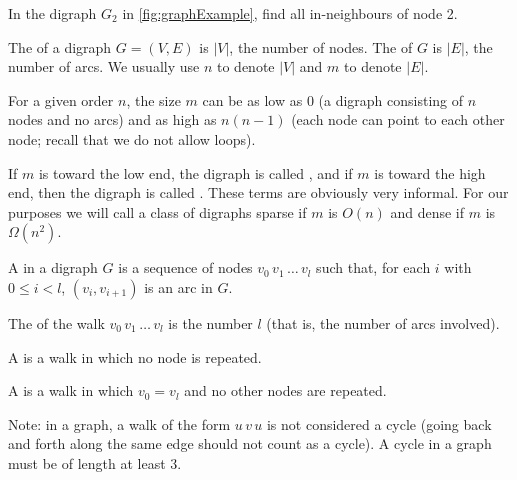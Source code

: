 \begin{Boxample}[2]
In the digraph $G_2$ in \cref{fig:graphExample}, find all in-neighbours of node 2.
\end{Boxample}


%


\begin{Definition} 
The  of a digraph $G=(V,E)$ is $|V|$, the number of nodes. 
The  of $G$ is $|E|$, the number of arcs. We usually use $n$ to denote $|V|$ and $m$ to denote
$|E|$.

\end{Definition}
 

For a given order $n$, the size $m$ can be as low as $0$ (a digraph
consisting of $n$ nodes and no arcs)  and as high as
$n(n-1)$ (each node can point to each other node; recall that we do
not allow loops).

\begin{Definition}  If $m$ is toward the low end, the digraph is called
, and if $m$ is toward the high end, then the digraph
is called . These terms are obviously very informal. For
our purposes we will call a class of digraphs sparse if $m$ is $O(n)$
and dense if $m$ is $\Omega(n^2)$.
\end{Definition}


\begin{Definition} 
A  in a digraph $G$ is a sequence of nodes $v_0\, v_1\,
\ldots\, v_l$ such that, for each $i$ with $0 \leq i < l$, $(v_i,
v_{i+1})$ is an arc in $G$. 

The  of the walk $v_0\, v_1\,
\ldots \,v_l$ is the number $l$ (that is, the number of arcs involved).

A  is a walk in which no node is repeated. 

A  is a walk in which $v_0 = v_l$ and no other nodes
are repeated.
\end{Definition}

Note: in a graph, a walk of the form $u\, v\, u$ is not considered a cycle (going back and forth along the same edge should not count as a
cycle). A cycle in a graph must be of length at least $3$.


